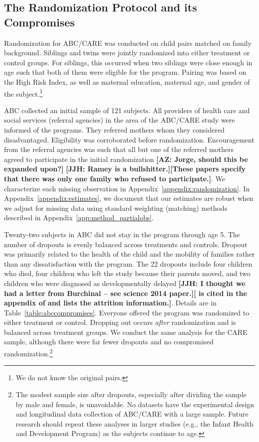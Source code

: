 \subsection{The Randomization Protocol and its Compromises} \label{section:randomization}

Randomization for ABC/CARE was conducted on child pairs matched on family background. Siblings and twins were jointly randomized into either treatment or control groups. For siblings, this occurred when two siblings were close enough in age such that both of them were eligible for the program. Pairing was based on the High Risk Index, as well as maternal education, maternal age, and gender of the subject.\footnote{We do not know the original pairs.} 

ABC collected an initial sample of 121 subjects. All providers of health care and social services (referral agencies) in the area of the ABC/CARE study were informed of the programs. They referred mothers whom they considered disadvantaged. Eligibility was corroborated before randomization. Encouragement from the referral agencies was such that all but one of the referred mothers agreed to participate in the initial randomization \textbf{[AZ: Jorge, should this be expanded upon?]} \citep{Ramey_Yeates_Short_1984_CD,Campbell_Ramey_1995_AERJ} \textbf{[JJH: Ramey is a bullshitter.][These papers specify that there was only one family who refused to participate.]}. We characterize each missing observation in Appendix~\ref{appendix:randomization}. In Appendix~\ref{appendix:estimates}, we document that our estimates are robust when we adjust for missing data using standard weighting (matching) methods described in Appendix~\ref{app:method_partialobs}. 

Twenty-two subjects in ABC did not stay in the program through age 5. The number of dropouts is evenly balanced across treatments and controls. Dropout was primarily related to the health of the child and the mobility of families rather than any dissatisfaction with the program. The 22 dropouts include four children who died, four children who left the study because their parents moved, and two children who were diagnosed as developmentally delayed \citep{Burchinal_Campbell_etal_1997_CD} \textbf{[JJH: I thought we had a letter from Burchinal -- see science 2014 paper.][\citet{Burchinal_Campbell_etal_1997_CD}  is cited in the appendix of \citet{Campbell_Conti_etal_2014_EarlyChildhoodInvestments} and lists the attrition information.]}. Details are in Table~\ref{table:abccompromises}. Everyone offered the program was randomized to either treatment or control. Dropping out occurs \emph{after} randomization and is balanced across treatment groups. We conduct the same analysis for the CARE sample, although there were far fewer dropouts and no compromised randomization.\footnote{The modest sample size after dropouts, especially after dividing the sample by male and female, is unavoidable. No datasets have the experimental design and longitudinal data collection of ABC/CARE with a large sample. Future research should repeat these analyses in larger studies (e.g., the Infant Health and Development Program) as the subjects continue to age.} 

